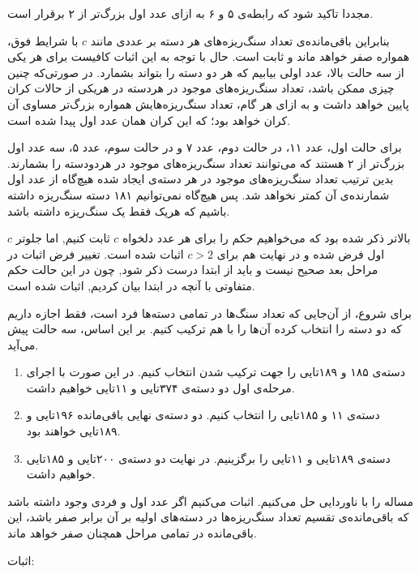 \documentclass[11pt,largemargins]{h2wp}
\begin{document}
    
    مجددا تاکید شود که رابطه‌ی ۵ و ۶ به ازای عدد اول بزرگ‌تر از ۲ برقرار است.
    
    بنابراین باقی‌مانده‌ی تعداد سنگ‌ریزه‌های هر دسته بر عددی مانند
    $c$
    با شرایط فوق، همواره صفر خواهد ماند و ثابت است.
    حال با توجه به این اثبات کافیست برای هر یکی از سه حالت بالا، عدد اولی بیابیم که هر دو دسته را بتواند بشمارد.
    در صورتی‌که چنین چیزی ممکن باشد، تعداد سنگ‌ریزه‌های موجود در هردسته در هریکی از حالات کران پایین خواهد داشت و به ازای هر گام، تعداد سنگ‌ریزه‌هایش همواره بزرگ‌تر مساوی آن کران خواهد بود؛
    که این کران همان عدد اول پیدا شده است.
    
    برای حالت اول، عدد ۱۱، در حالت دوم، عدد ۷ و در حالت سوم، عدد ۵، سه عدد اول بزرگ‌تر از ۲ هستند که می‌توانند تعداد سنگ‌ریزه‌های موجود در هردودسته را بشمارند.
    بدین ترتیب تعداد سنگ‌ریزه‌های موجود در هر دسته‌‌ی ایجاد شده هیچ‌گاه از عدد اول شمارنده‌ی آن کمتر نخواهد شد.
    پس هیچ‌گاه نمی‌توانیم ۱۸۱ دسته سنگ‌ریزه داشته باشیم که هریک فقط یک سنگ‌ریزه داشته باشد.
    
    

\notes
{}
بالاتر ذکر شده بود که می‌خواهیم حکم را برای هر عدد دلخواه $c$ ثابت کنیم, اما جلوتر $c$ اول فرض شده و در نهایت هم برای $c>2$ اثبات شده است.
تغییر فرض اثبات در مراحل بعد صحیح نیست و باید از ابتدا درست ذکر شود, چون در این حالت حکم متفاوتی با آنچه در ابتدا بیان کردیم, اثبات شده است.

 برای شروع، از آن‌جایی که تعداد سنگ‌ها در تمامی دسته‌ها فرد است، فقط اجازه داریم که دو دسته را انتخاب کرده آن‌ها را با هم ترکیب کنیم.
    بر این اساس، سه حالت پیش می‌آید.
    \begin{enumerate}
        \item 
        دسته‌ی ۱۸۵ و ۱۸۹تایی را جهت ترکیب شدن انتخاب کنیم. در این صورت با اجرای مرحله‌ی اول دو دسته‌ی ۳۷۴تایی و ۱۱تایی خواهیم داشت.
        \item 
        دسته‌ی ۱۱ و ۱۸۵تایی را انتخاب کنیم. دو دسته‌ی نهایی باقی‌مانده ۱۹۶تایی و ۱۸۹تایی خواهند بود.
        \item
        دسته‌ی ۱۸۹تایی و ۱۱تایی را برگزینیم. در نهایت دو دسته‌ی ۲۰۰تایی و ۱۸۵تایی خواهیم داشت.
    \end{enumerate}
    
    مساله را با ناوردایی حل می‌کنیم.
    اثبات می‌کنیم اگر عدد اول و فردی وجود داشته باشد که باقی‌مانده‌ی تقسیم تعداد سنگ‌ریزه‌ها در دسته‌های اولیه بر آن برابر صفر باشد، این باقی‌مانده در تمامی مراحل همچنان صفر خواهد ماند.
    
   اثبات:
   
\end{document}
